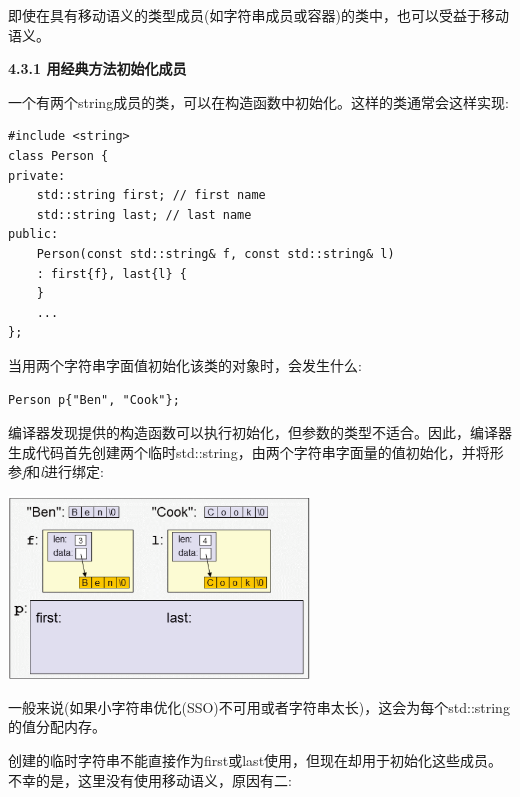 即使在具有移动语义的类型成员(如字符串成员或容器)的类中，也可以受益于移动语义。\par

\hspace*{\fill} \par %
\textbf{4.3.1 用经典方法初始化成员}

一个有两个string成员的类，可以在构造函数中初始化。这样的类通常会这样实现:\par

{\color{red}{basics/customer.hpp}}

\begin{lstlisting}[caption={}]
#include <string>
class Person {
private:
	std::string first; // first name
	std::string last; // last name
public:
	Person(const std::string& f, const std::string& l)
	: first{f}, last{l} {
	}
	...
};
\end{lstlisting}

当用两个字符串字面值初始化该类的对象时，会发生什么:\par

\begin{lstlisting}[caption={}]
Person p{"Ben", "Cook"};
\end{lstlisting}

编译器发现提供的构造函数可以执行初始化，但参数的类型不适合。因此，编译器生成代码首先创建两个临时std::string，由两个字符串字面量的值初始化，并将形参\textit{f}和\textit{l}进行绑定:\par

\begin{center}
	\includegraphics[width=0.6\textwidth]{content/1/chapter4/images/1}
\end{center}

一般来说(如果小字符串优化(SSO)不可用或者字符串太长)，这会为每个std::string的值分配内存。\par

创建的临时字符串不能直接作为first或last使用，但现在却用于初始化这些成员。不幸的是，这里没有使用移动语义，原因有二:\par

